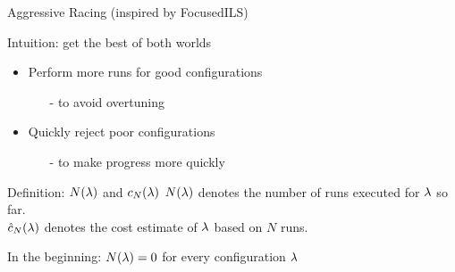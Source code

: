 \begin{frame}[c,fragile]{Aggressive Racing (inspired by FocusedILS) }

Intuition: get the best of both worlds
\begin{itemize}
\item Perform more runs for good configurations
\begin{itemize}
\item[-] to avoid overtuning
\end{itemize}
\item Quickly reject poor configurations
\begin{itemize}
\item[-] to make progress more quickly
\end{itemize}
\end{itemize}

\pause
\medskip

\begin{block}{Definition: $N(\mathbf{\lambda})$ and $c_N(\mathbf{\lambda})$}
\alert{$N(\mathbf{\lambda})$} denotes the number of runs executed for $\mathbf{\lambda}$ so far.\\
\alert{$\hat{c}_N(\mathbf{\lambda})$} denotes the cost estimate of $\mathbf{\lambda}$ based on $N$ runs.
\end{block}

\pause
In the beginning: $N(\mathbf{\lambda})=0$ for every configuration $\mathbf{\lambda}$

\end{frame}




